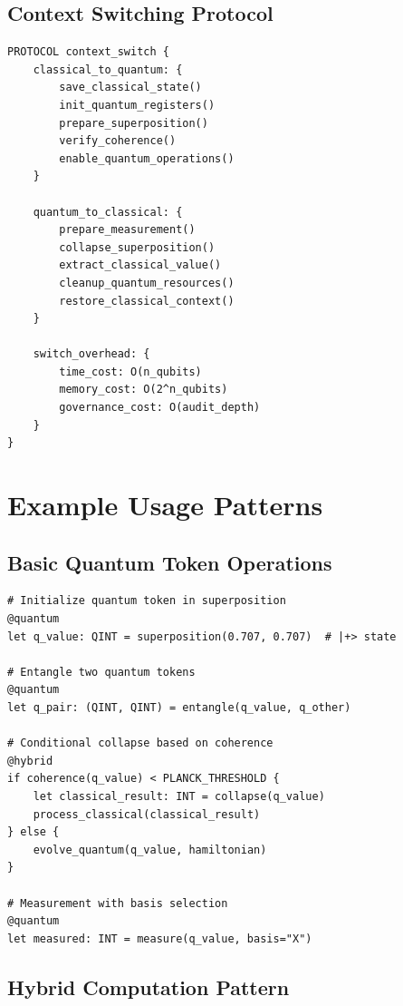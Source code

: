 \documentclass[12pt,a4paper]{article}
\begin{document}
\subsection{Context Switching Protocol}

\begin{lstlisting}[style=riftlang,caption={Quantum-Classical Context Switch}]
PROTOCOL context_switch {
    classical_to_quantum: {
        save_classical_state()
        init_quantum_registers()
        prepare_superposition()
        verify_coherence()
        enable_quantum_operations()
    }
    
    quantum_to_classical: {
        prepare_measurement()
        collapse_superposition()
        extract_classical_value()
        cleanup_quantum_resources()
        restore_classical_context()
    }
    
    switch_overhead: {
        time_cost: O(n_qubits)
        memory_cost: O(2^n_qubits)
        governance_cost: O(audit_depth)
    }
}
\end{lstlisting}

\section{Example Usage Patterns}

\subsection{Basic Quantum Token Operations}

\begin{lstlisting}[style=riftlang,caption={Quantum Token Usage Examples}]
# Initialize quantum token in superposition
@quantum
let q_value: QINT = superposition(0.707, 0.707)  # |+> state

# Entangle two quantum tokens
@quantum
let q_pair: (QINT, QINT) = entangle(q_value, q_other)

# Conditional collapse based on coherence
@hybrid
if coherence(q_value) < PLANCK_THRESHOLD {
    let classical_result: INT = collapse(q_value)
    process_classical(classical_result)
} else {
    evolve_quantum(q_value, hamiltonian)
}

# Measurement with basis selection
@quantum
let measured: INT = measure(q_value, basis="X")
\end{lstlisting}

\subsection{Hybrid Computation Pattern}
\end{document}
